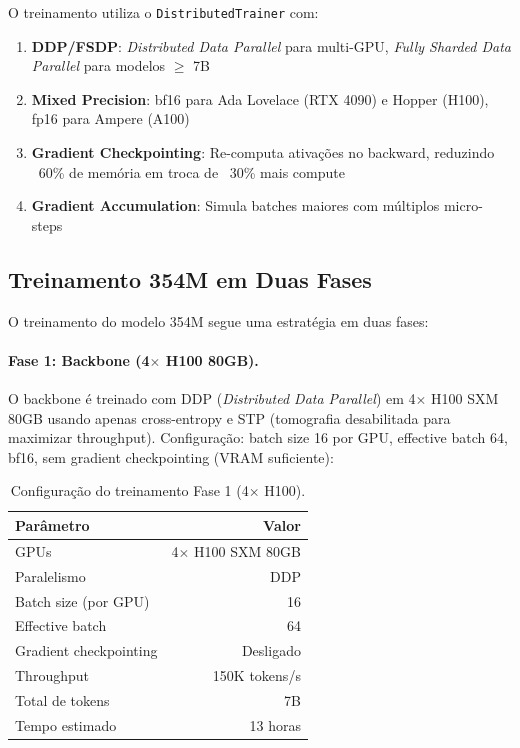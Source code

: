 O treinamento utiliza o \texttt{DistributedTrainer} com:

\begin{enumerate}
    \item \textbf{DDP/FSDP}: \textit{Distributed Data Parallel} para multi-GPU,
    \textit{Fully Sharded Data Parallel} para modelos $\geq$ 7B
    \item \textbf{Mixed Precision}: bf16 para Ada Lovelace (RTX 4090) e
    Hopper (H100), fp16 para Ampere (A100)
    \item \textbf{Gradient Checkpointing}: Re-computa ativa\c{c}\~oes no
    backward, reduzindo ~60\% de mem\'oria em troca de ~30\% mais compute
    \item \textbf{Gradient Accumulation}: Simula batches maiores com
    m\'ultiplos micro-steps
\end{enumerate}

\subsection{Treinamento 354M em Duas Fases}

O treinamento do modelo 354M segue uma estrat\'egia em duas fases:

\paragraph{Fase 1: Backbone (4$\times$ H100 80GB).}
O backbone \'e treinado com DDP (\textit{Distributed Data Parallel}) em 4$\times$ H100 SXM 80GB
usando apenas cross-entropy e STP (tomografia desabilitada para maximizar throughput).
Configura\c{c}\~ao: batch size 16 por GPU, effective batch 64, bf16,
sem gradient checkpointing (VRAM suficiente):

\begin{table}[H]
\centering
\caption{Configura\c{c}\~ao do treinamento Fase 1 (4$\times$ H100).}
\label{tab:phase1}
\begin{tabular}{lr}
\toprule
\textbf{Par\^ametro} & \textbf{Valor} \\
\midrule
GPUs & 4$\times$ H100 SXM 80GB \\
Paralelismo & DDP \\
Batch size (por GPU) & 16 \\
Effective batch & 64 \\
Gradient checkpointing & Desligado \\
Throughput & ~150K tokens/s \\
Total de tokens & 7B \\
Tempo estimado & ~13 horas \\
\bottomrule
\end{tabular}
\end{table}

